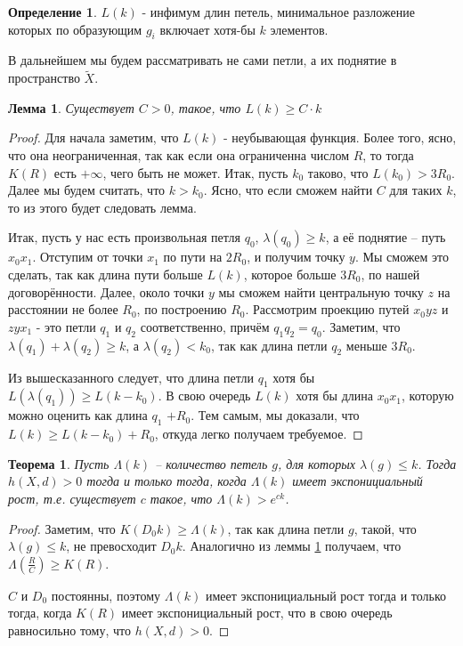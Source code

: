 \documentclass[11pt]{article}
\theoremstyle{definition}
\newtheorem{defin}{Определение}%
\theoremstyle{plain}
\theoremstyle{plain}
\newtheorem{lemma}{Лемма}
\newtheorem{theorem}{Теорема}
\def\leq{\leqslant}
\def\geq{\geqslant}
\def\wt#1{\widetilde{#1}}
\begin{document}
\begin{defin}
	$L(k)$ - инфимум длин петель, минимальное разложение которых по образующим $g_i$ включает хотя-бы $k$ элементов.
\end{defin}
В дальнейшем мы будем рассматривать не сами петли, а их поднятие в пространство $\wt{X}$.

\begin{lemma}\label{l_C}
Существует $C > 0$, такое, что $L(k) \geq C \cdot k$
\end{lemma}
\begin{proof}
Для начала заметим, что $L(k)$ - неубывающая функция. Более того, ясно, что она неограниченная, так как если она ограниченна числом $R$, 
то тогда $K(R)$ есть $+\infty$, чего быть не может. Итак, пусть $k_0$ таково, что $L(k_0) > 3 R_0$.
Далее мы будем считать, что $k > k_0$. Ясно, что если сможем найти $C$ для таких $k$, то из этого будет следовать лемма.

Итак, пусть у нас есть произвольная петля $q_0$, $\lambda(q_0) \geq k$, а её поднятие -- путь $x_0 x_1$.
Отступим от точки $x_1$ по пути на $2R_0$, и получим точку $y$.
Мы сможем это сделать, так как длина пути больше $L(k)$, которое больше $3R_0$, по нашей договорённости.
Далее, около точки $y$ мы сможем найти центральную точку $z$ на расстоянии не более $R_0$, по построению $R_0$.
Рассмотрим проекцию путей $x_0yz$ и $zyx_1$ - это петли $q_1$ и $q_2$ соответственно, причём $q_1q_2 = q_0$.
Заметим, что $\lambda(q_1) + \lambda(q_2) \geq k$, а $\lambda(q_2) < k_0$, так как длина петли $q_2$ меньше $3R_0$. 

Из вышесказанного следует, что длина петли $q_1$ хотя бы $L(\lambda(q_1)) \geq L(k-k_0)$.
В свою очередь $L(k)$ хотя бы длина $x_0x_1$, которую можно оценить как длина $q_1$ $+ R_0$. 
Тем самым, мы доказали, что $L(k) \geq L(k-k_0) + R_0$, откуда легко получаем требуемое.
\end{proof}


\begin{theorem}
Пусть $\Lambda(k)$ -- количество петель $g$, для которых $\lambda(g) \leq k$. 
Тогда $h(X, d) > 0$ тогда и только тогда, когда $\Lambda(k)$ имеет экспонициальный рост, 
т.е. существует $c$ такое, что $\Lambda(k) > e^{ck}$.
\end{theorem}

\begin{proof}
Заметим, что $K(D_0 k) \geq \Lambda(k)$, так как длина петли $g$, такой, что $\lambda(g) \leq k$, не превосходит $D_0 k$.
Аналогично из леммы \ref{l_C} получаем, что $\Lambda(\frac{R}{C}) \geq K(R)$.

$C$ и $D_0$ постоянны, поэтому $\Lambda(k)$ имеет экспонициальный рост тогда и только тогда, когда $K(R)$ имеет экспонициальный рост,
что в свою очередь равносильно тому, что $h(X, d) > 0$.

\end{proof}
\end{document}
